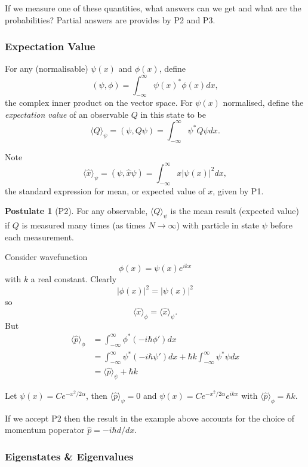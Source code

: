 \documentclass[a4paper]{article}
\theoremstyle{definition}
\newtheorem*{postulate}{Postulate}
\begin{document}
If we measure one of these quantities, what answers can we get and what are the probabilities? Partial answers are provides by P2 and P3.

\subsubsection{Expectation Value}

For any (normalisable) $\psi(x)$ and $\phi(x)$, define
\[
  (\psi, \phi) = \int_{-\infty}^\infty \psi(x)^* \phi(x) dx,
\]
the complex inner product on the vector space. For $\psi(x)$ normalised, define the \emph{expectation value} of an observable $Q$ in this state to be
\[
  \langle Q \rangle_\psi = (\psi, Q\psi) = \int_{-\infty}^\infty \psi^* Q\psi dx.
\]

Note
\[
  \langle \hat x \rangle_\psi = (\psi, \hat x \psi) = \int_{-\infty}^\infty x |\psi(x)|^2 dx,
\]
the standard expression for mean, or expected value of $x$, given by P1.

\begin{postulate}[P2]
  \label{postulate:2}
  For any observable, $\langle Q\rangle_\psi$ is the mean result (expected value) if $Q$ is measured many times (as times $N\to\infty$) with particle in state $\psi$ before each measurement.
\end{postulate}

Consider wavefunction
\[
  \phi(x) = \psi(x)e^{ikx}
\]
with $k$ a real constant. Clearly
\[
  |\phi(x)|^2 = |\psi(x)|^2
\]
so
\[
  \langle \hat x\rangle_\phi = \langle \hat x\rangle_\psi.
\]
But
\begin{align*}
  \langle\hat p\rangle_\phi &= \int_{-\infty}^\infty \phi^*(-i\hbar\phi')dx \\
  &= \int_{-\infty}^\infty \psi^*(-i\hbar\psi')dx + \hbar k\int_{-\infty}^\infty \psi^*\psi dx \\
  &= \langle \hat p\rangle_\psi + \hbar k
\end{align*}

\begin{eg}
  Let $\psi(x) = Ce^{-x^2/2\alpha}$, then $\langle\hat p\rangle_\psi = 0$ and $\psi(x) = Ce^{-x^2/2\alpha}e^{ikx}$ with $\langle\hat p\rangle_\phi = \hbar k$.
\end{eg}

If we accept P2 then the result in the example above accounts for the choice of momentum poperator \(\hat p = -i\hbar d/dx\).

\subsubsection{Eigenstates \& Eigenvalues}
\end{document}
